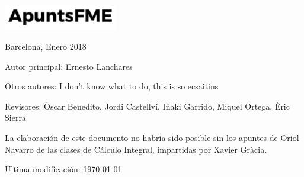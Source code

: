 \begin{titlepage}
    \vspace{1\baselineskip} %


    \vspace{2\baselineskip} %


    \vfill %
    

    \includegraphics[width=5cm]{../logo.pdf}

    \vspace{0.3\baselineskip} %
     
    Barcelona, Enero 2018



\end{titlepage}

\vspace*{\fill}

\noindent Autor principal: Ernesto Lanchares

\quad

\noindent Otros autores: I don't know what to do, this is so ecsaitins

\quad

\noindent Revisores: Òscar Benedito, Jordi Castellví, Iñaki Garrido, Miquel Ortega, Èric Sierra

\quad

\noindent La elaboración de este documento no habría sido posible sin los apuntes de Oriol Navarro de las clases de C\'alculo Integral, impartidas por Xavier Gr\`acia.

\quad

\noindent Última modificación: \today
\doclicenseThis
